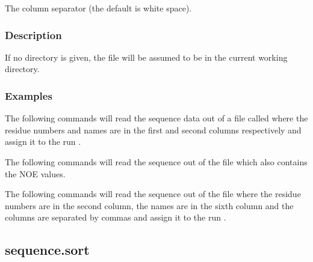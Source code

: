   The column separator (the default is white space).

\subsubsection{Description}

If no directory is given, the file will be assumed to be in the current working directory.


\subsubsection{Examples}

The following commands will read the sequence data out of a file called 
 where the
residue numbers and names are in the first and second columns respectively and assign it to
the run 
.






The following commands will read the sequence out of the file 
 which also contains
the NOE values.






The following commands will read the sequence out of the file 
 where the
residue numbers are in the second column, the names are in the sixth column and the columns
are separated by commas and assign it to the run 
.





\newpage

\subsection{sequence.sort}


